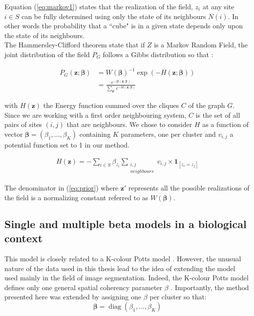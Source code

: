 Equation (\ref{eq:markov1}) states that the realization of the field, $z_{i}$ at any site $i \in S$ can be fully determined using only the state of its neighbours $N(i)$. In other words the probability that a ``cube" is in a given state depends only upon the state of its neighbours.\\
The Hammersley-Clifford theorem state that if $Z$ is a Markov Random Field, the joint distribution of the field $P_G$ follows a Gibbs distribution so that :

\begin{align}
\label{eq:prior}
P_G (\boldsymbol{z;\beta}) &= W(\boldsymbol{\beta})^{-1} \exp{(-H(\boldsymbol{z;\beta}))} \nonumber\\
&= \frac{e^{-H(\boldsymbol{z;\beta})}}{\sum\limits_{\boldsymbol{z'}} e^{-H(\boldsymbol{z;\beta})}}
\end{align}

with $H(\boldsymbol{z})$ the Energy function summed over the cliques $C$ of the graph $G$. Since we are working with a first order neighbouring system, $C$ is the set of all pairs of sites $(i,j)$ that are neighbours. We chose to consider $H$ as a function of vector $\boldsymbol{\beta} = (\beta_1, \hdots, \beta_K)$ containing $K$ parameters, one per cluster and $v_{i,j}$ a potential function set to 1 in our method. 

\begin{align}
\label{eq:Energy}
H(\boldsymbol{z}) = - \sum\limits_{i \in S}\beta_{z_i}\sum_{\substack{i,j\\neighbours}}v_{i,j}\times\boldsymbol{1}_{[z_i = z_j]} 
\end{align}

The denominator in (\ref{eq:prior}) where $\boldsymbol{z'}$ represents all the possible realizations of the field is a normalizing constant referred to as $W(\boldsymbol{\beta})$.\\

	\subsection{Single and multiple beta models in a biological context}
This model is closely related to a K-colour Potts model \cite{Wu82}. However, the unusual nature of the data used in this thesis lead to the idea of extending the model used mainly in the field of image segmentation. Indeed, the K-colour Potts model defines only one general spatial coherency parameter $\beta$ \cite{subudhi14,zhang14}. Importantly, the method presented here was extended by assigning one $\beta$ per cluster so that:
\begin{equation*}
\label{eq:beta}
\boldsymbol{\beta} = \operatorname{diag}(\beta_{1},...,\beta_{K})
\end{equation*}

